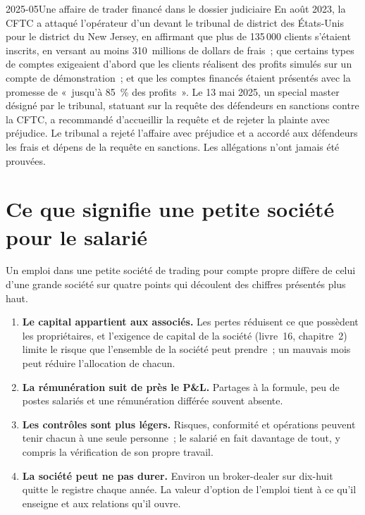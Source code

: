 \begin{dated}{2025-05}{Une affaire de trader financé dans le dossier judiciaire}\label{dat:in:medium-frequency-proprietary-shops:mff}
En août 2023, la CFTC a attaqué l'opérateur d'un  devant le tribunal de district des États-Unis pour le district du New
Jersey, en affirmant que plus de 135\,000 clients s'étaient inscrits, en versant au moins 310~millions de dollars de frais~; que certains
types de comptes exigeaient d'abord que les clients réalisent des profits simulés sur un compte de démonstration~; et que les comptes financés
étaient présentés avec la promesse de «~jusqu'à 85~\% des profits~». Le 13 mai 2025, un special master désigné par le tribunal, statuant sur la
requête des défendeurs en sanctions contre la CFTC, a recommandé d'accueillir la requête et de rejeter la plainte
avec préjudice. Le tribunal a rejeté l'affaire avec préjudice et a accordé aux défendeurs les frais et dépens de la
requête en sanctions. Les allégations n'ont jamais été prouvées.
\end{dated}

\section{Ce que signifie une petite société pour le salarié}

Un emploi dans une petite société de trading pour compte propre diffère de celui d'une grande société sur quatre points qui découlent des chiffres présentés plus haut.
\begin{enumerate}
\item \textbf{Le capital appartient aux associés.} Les pertes réduisent ce que possèdent les propriétaires, et l'exigence de capital de la société
(livre~16, chapitre~2) limite le risque que l'ensemble de la société peut prendre~; un mauvais mois peut réduire l'allocation de chacun.
\item \textbf{La rémunération suit de près le P\&L.} Partages à la formule, peu de postes salariés et une rémunération différée souvent absente.
\item \textbf{Les contrôles sont plus légers.} Risques, conformité et opérations peuvent tenir chacun à une seule personne~; le salarié en fait davantage de
tout, y compris la vérification de son propre travail.
\item \textbf{La société peut ne pas durer.} Environ un broker-dealer sur dix-huit quitte le registre chaque année. La valeur d'option de l'emploi tient à ce qu'il enseigne et aux relations qu'il ouvre.
\end{enumerate}

